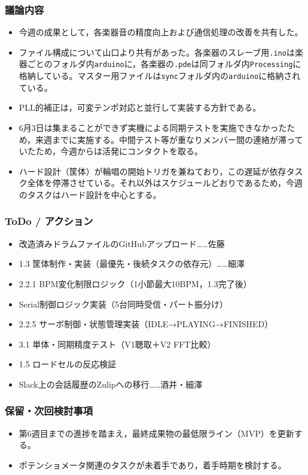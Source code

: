 \documentclass[a4paper,12pt]{ltjsarticle}
\begin{document}
\subsubsection*{議論内容}
\begin{itemize}[leftmargin=1.5em]
  \item 今週の成果として，各楽器音の精度向上および通信処理の改善を共有した。
  \item ファイル構成について山口より共有があった。各楽器のスレーブ用\texttt{.ino}は楽器ごとのフォルダ内\texttt{arduino}に，各楽器の\texttt{.pde}は同フォルダ内\texttt{Processing}に格納している。マスター用ファイルは\texttt{sync}フォルダ内の\texttt{arduino}に格納されている。
  \item PLL的補正は，可変テンポ対応と並行して実装する方針である。
  \item 6月3日は集まることができず実機による同期テストを実施できなかったため，来週までに実施する。中間テスト等が重なりメンバー間の連絡が滞っていたため，今週からは活発にコンタクトを取る。
  \item ハード設計（筐体）が輪唱の開始トリガを兼ねており，この遅延が依存タスク全体を停滞させている。それ以外はスケジュールどおりであるため，今週のタスクはハード設計を中心とする。
\end{itemize}

\subsubsection*{ToDo / アクション}
\begin{itemize}[leftmargin=1.5em]
  \item 改造済みドラムファイルのGitHubアップロード……佐藤
  \item 1.3 筐体制作・実装（最優先・後続タスクの依存元）……細澤
  \item 2.2.1 BPM変化制限ロジック（1小節最大10BPM，1.3完了後）
  \item Serial制御ロジック実装（5台同時受信・パート振分け）
  \item 2.2.5 サーボ制御・状態管理実装（IDLE→PLAYING→FINISHED）
  \item 3.1 単体・同期精度テスト（V1聴取＋V2 FFT比較）
  \item 1.5 ロードセルの反応検証
  \item Slack上の会話履歴のZulipへの移行……酒井・細澤
\end{itemize}

\subsubsection*{保留・次回検討事項}
\begin{itemize}[leftmargin=1.5em]
  \item 第6週目までの進捗を踏まえ，最終成果物の最低限ライン（MVP）を更新する。
  \item ポテンショメータ関連のタスクが未着手であり，着手時期を検討する。
\end{itemize}
\end{document}
